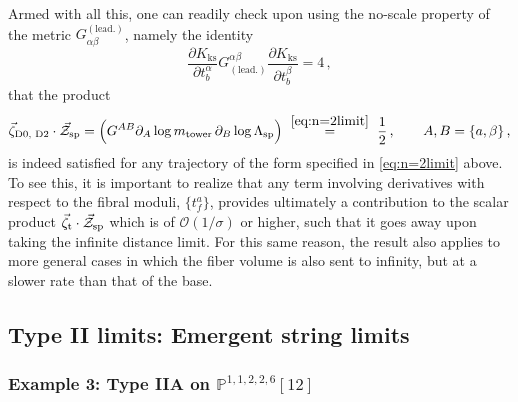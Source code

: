 Armed with all this, one can readily check upon using the no-scale property of the metric $G^{(\text{lead.})}_{\alpha \beta}$, namely the identity%
%
\begin{equation}\label{eq:noscale}
	\frac{\partial K_{\text{ks}}}{\partial t^{\alpha}_b} G_{(\text{lead.})}^{\alpha \beta} \frac{\partial K_{\text{ks}}}{\partial t^{\beta}_b} = 4\, ,
\end{equation}
%
that the product
%
\begin{equation}
	\vec{\zeta}_{\text{D0, D2}}\cdot\vec{\mathcal{Z}}_{\rm sp}=\left(G^{A B}\partial_{A}\log m_{\text{tower}}\,\partial_{B}\log \Lambda_{\rm sp}\right) \stackrel{~\eqref{eq:n=2limit}~}{=} \frac{1}{2}\, , \qquad A, B= \lbrace a, \beta \rbrace\, ,
\end{equation}
%
is indeed satisfied for any trajectory of the form specified in \eqref{eq:n=2limit} above. To see this, it is important to realize that any term involving derivatives with respect to the fibral moduli, $\{t^a_f\}$, provides ultimately a contribution to the scalar product $\vec{\zeta}_{\text{t}}\cdot\vec{\mathcal{Z}}_{\rm sp}$ which is of $\mathcal{O}\left(1/\sigma\right)$ or higher, such that it goes away upon taking the infinite distance limit. For this same reason, the result also applies to more general cases in which the fiber volume is also sent to infinity, but at a slower rate than that of the base.
	
\subsection{Type II limits: Emergent string limits}
\label{ss:typeIIlimits}
	
\subsubsection{Example 3: Type IIA on $\mathbb{P}^{1,1,2,2,6} [12]$}
\label{sss:ExampleIII}
	
